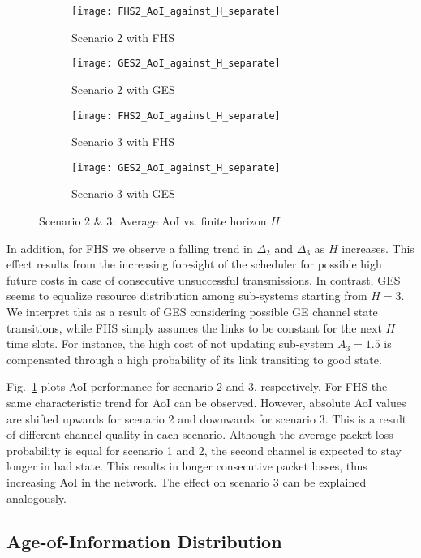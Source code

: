 \begin{figure}[p]
  \centering
  \begin{subfigure}{0.49\textwidth}
    \centering
    \texttt{[image: FHS2\_AoI\_against\_H\_separate]}
    \caption{Scenario 2 with FHS}
  \end{subfigure}
  \hfill
  \begin{subfigure}{0.49\textwidth}
    \centering
    \texttt{[image: GES2\_AoI\_against\_H\_separate]}
    \caption{Scenario 2 with GES}
  \end{subfigure}
  \begin{subfigure}{0.49\textwidth}
    \centering
    \texttt{[image: FHS2\_AoI\_against\_H\_separate]}
    \caption{Scenario 3 with FHS}
  \end{subfigure}
  \hfill
  \begin{subfigure}{0.49\textwidth}
    \centering
    \texttt{[image: GES2\_AoI\_against\_H\_separate]}
    \caption{Scenario 3 with GES}
  \end{subfigure}
  \caption{Scenario 2 \& 3: Average AoI vs. finite horizon $H$}
  \label{fig:AoIseperate2}
\end{figure}

In addition, for FHS we observe a falling trend in $\Delta_2$ and $\Delta_3$ as
$H$ increases. This effect results from the increasing foresight of the
scheduler for possible high future costs in case of consecutive unsuccessful
transmissions. In contrast, GES seems to equalize resource distribution among
sub-systems starting from $H=3$. We interpret this as a result of GES
considering possible GE channel state transitions, while FHS simply assumes the
links to be constant for the next $H$ time slots. For instance, the high cost of
not updating sub-system $A_3=1.5$ is compensated through a high probability of
its link transiting to good state.

Fig.~\ref{fig:AoIseperate2} plots AoI performance for scenario 2 and 3,
respectively. For FHS the same characteristic trend for AoI can be observed.
However, absolute AoI values are shifted upwards for scenario 2 and downwards
for scenario 3. This is a result of different channel quality in each scenario.
Although the average packet loss probability is equal for scenario 1 and 2, the
second channel is expected to stay longer in bad state. This results in longer
consecutive packet losses, thus increasing AoI in the network. The effect on
scenario 3 can be explained analogously.

\subsection{Age-of-Information Distribution}

